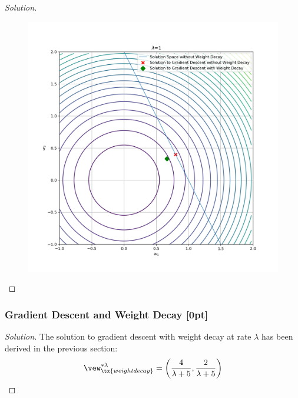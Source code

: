 \documentclass{article}
\begin{document}
\begin{proof}[Solution]
\begin{figure}[H]
			\includegraphics[width=\linewidth]{plot_q1.png}
		\end{figure}
	\end{proof}
	
	\subsubsection{Gradient Descent and Weight Decay [0pt]}
	\begin{proof}[Solution]
		The solution to gradient descent with weight decay at rate $\lambda$ has been derived in the previous section:
		\begin{align}
			\vew^{*\lambda}_\tx{weight decay} = \left(\frac{4}{\lambda +5}, \frac{2}{\lambda +5}\right)
		\end{align}
	\end{proof}
	
\end{document}
